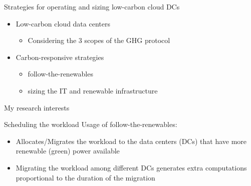 \documentclass[Ligatures=TeX,table,svgnames,usetotalslideindicator,compress,10pt]{beamer}
\begin{document}
\begin{frame}{Strategies for operating and sizing low-carbon cloud DCs}
  \begin{itemize}    
  \item Low-carbon cloud data centers
  \begin{itemize}
     \item Considering the 3 scopes of the GHG protocol
  \end{itemize}
\end{itemize}

\begin{itemize}  
  \item Carbon-responsive strategies
    \begin{itemize}
    \item  follow-the-renewables
     \item  sizing the IT and renewable infrastructure
     \end{itemize}
   \end{itemize}   
\end{frame}


\begin{frame}{My research interests}
  
  Scheduling the workload Usage of follow-the-renewables:
  
  \begin{itemize}
    
  \item Allocates/Migrates the workload to the data centers (DCs) that have more renewable (green) power available
  \item Migrating the workload among different DCs generates extra computations proportional to the duration of the migration

  \end{itemize}

\end{frame}
\end{document}

